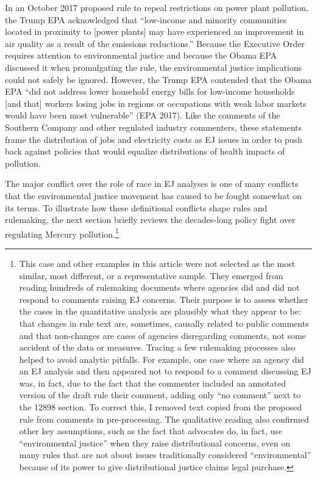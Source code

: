 \documentclass[
      12pt,
        ]{article}
\begin{document}
In an October 2017 proposed rule to repeal
restrictions on power plant pollution, the Trump EPA acknowledged that
``low-income and minority communities located in proximity to {[}power
plants{]} may have experienced an improvement in air quality as a result
of the emissions reductions.'' Because the Executive Order requires
attention to environmental justice and because the Obama EPA discussed
it when promulgating the rule, the environmental justice implications could not safely
be ignored. However, the Trump EPA contended that the Obama EPA ``did not
address lower household energy bills for low-income households {[}and
that{]} workers losing jobs in regions or occupations with weak labor
markets would have been most vulnerable'' (EPA 2017). Like the comments of the Southern Company and other regulated industry commenters, these statements frame the distribution of jobs and electricity costs as EJ issues in order to push back against policies that would equalize distributions of health impacts of pollution.

The major conflict over the role of race in EJ analyses is one of many conflicts that the environmental justice movement has caused to be fought somewhat on its terms. To illustrate how these definitional conflicts shape rules and rulemaking, the next section briefly reviews the decades-long policy fight over regulating Mercury pollution.\footnote{This case and other examples in this article were not selected as the most similar, most different, or a representative sample. They emerged from reading hundreds of rulemaking documents where agencies did and did not respond to comments raising EJ concerns. Their purpose is to assess whether the cases in the quantitative analysis are plausibly what they appear to be: that changes in rule text are, sometimes, causally related to public comments and that non-changes are cases of agencies disregarding comments, not some accident of the data or measures. Tracing a few rulemaking processes also helped to avoid analytic pitfalls. For example, one case where an agency did an EJ analysis and then appeared not to respond to a comment discussing EJ was, in fact, due to the fact that the commenter included an annotated version of the draft rule their comment, adding only ``no comment'' next to the 12898 section. To correct this, I removed text copied from the proposed rule from comments in pre-processing. The qualitative reading also confirmed other key assumptions, such as the fact that advocates do, in fact, use ``environmental justice'' when they raise distributional concerns, even on many rules that are not about issues traditionally considered ``environmental'' because of its power to give distributional justice claims legal purchase.}
\end{document}
